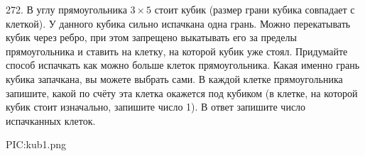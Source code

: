 272. В углу прямоугольника $3\times5$ стоит кубик (размер грани кубика совпадает с клеткой). У данного кубика сильно испачкана одна грань. Можно перекатывать кубик через ребро, при этом запрещено выкатывать его за пределы прямоугольника и ставить на клетку, на которой кубик уже стоял. Придумайте способ испачкать как можно больше клеток прямоугольника. Какая именно грань кубика запачкана, вы можете выбрать сами. В каждой клетке прямоугольника запишите, какой по счёту эта клетка окажется под кубиком (в клетке, на которой кубик стоит изначально, запишите число 1). В ответ запишите число испачканных клеток.
\begin{center}
{{PIC:kub1.png}}
\end{center}
